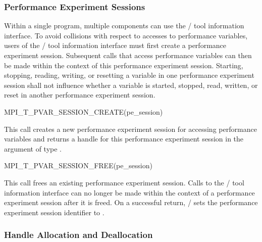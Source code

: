 \subsubsection{Performance Experiment Sessions}
\label{sec:mpit:sessions}

Within a single program, multiple components can use the \MPI/ tool
information interface.  To avoid collisions with respect to accesses to
performance variables, users of the \MPI/ tool information interface must
first create a performance experiment session.  Subsequent calls that
access performance variables can then be made within the context of this
performance experiment session.   Starting, stopping, reading, writing, or
resetting a variable in one performance experiment session shall not
influence whether a variable is started, stopped, read, written, or reset
in another performance experiment session.

\begin{funcdef}{MPI\_T\_PVAR\_SESSION\_CREATE}{(\mbox{pe\_session})}
\end{funcdef}

This call creates a new performance experiment session for accessing performance variables and
returns a handle for this performance experiment session in the argument  of type
.

\begin{funcdef}{MPI\_T\_PVAR\_SESSION\_FREE}{(\mbox{pe\_session})}
\end{funcdef}

This call frees an existing performance experiment session.  Calls to the \MPI/ tool information
interface  can no longer be made within the context of a performance experiment session after it
is freed.  On a successful return, \MPI/ sets the performance experiment session identifier to
.


\subsubsection{Handle Allocation and Deallocation}

